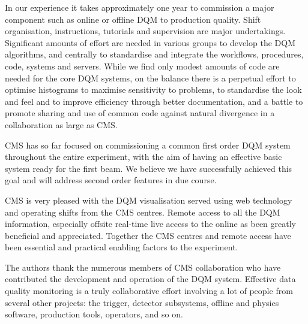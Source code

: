 \documentclass[a4paper]{jpconf}
\begin{document}
In our experience it takes approximately one year to commission a major
component such as online or offline DQM to production quality.  Shift
organisation, instructions, tutorials and supervision are major undertakings.
Significant amounts of effort are needed in various groups to develop the DQM
algorithms, and centrally to standardise and integrate the workflows,
procedures, code, systems and servers.  While we find only modest amounts of
code are needed for the core DQM systems, on the balance there is a perpetual
effort to optimise histograms to maximise sensitivity to problems, to
standardise the look and feel and to improve efficiency through better
documentation, and a battle to promote sharing and use of common code against
natural divergence in a collaboration as large as CMS.

CMS has so far focused on commissioning a common first order DQM system
throughout the entire experiment, with the aim of having an effective basic
system ready for the first beam.  We believe we have successfully achieved
this goal and will address second order features in due course.

CMS is very pleased with the DQM visualisation served using web technology and
operating shifts from the CMS centres.  Remote access to all the DQM
information, especially offsite real-time live access to the online as been
greatly beneficial and appreciated.  Together the CMS centres and remote
access have been essential and practical enabling factors to the experiment.


\ack

The authors thank the numerous members of CMS collaboration who have
contributed the development and operation of the DQM system.  Effective data
quality monitoring is a truly collaborative effort involving a lot of people
from several other projects: the trigger, detector subsystems, offline and
physics software, production tools, operators, and so on.
 
\end{document}
